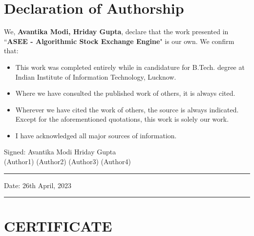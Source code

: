 \thispagestyle{empty}

\setcounter{page}{3}

\chapter*{Declaration of Authorship}

\vspace{1cm}

\noindent 
We, \textbf{Avantika Modi, Hriday Gupta}, declare that the work presented in ``\textbf{ASEE - Algorithmic Stock Exchange Engine}" is our own. We confirm that:

\medskip

\begin{itemize} 
    \item This work was completed entirely while in candidature for B.Tech. degree at Indian Institute of Information Technology, Lucknow.
    
    \medskip
    
    \item Where we have consulted the published work of others, it is always cited.
    
    \medskip
    
    \item Wherever we have cited the work of others, the source is always indicated. Except for the aforementioned quotations, this work is solely our work.
    
    \medskip
    
    \item I have acknowledged all major sources of information.
\end{itemize}

\vspace{2cm}

\noindent Signed: \hspace{0.4cm}Avantika Modi \hspace{0.4cm} Hriday Gupta\\

\hspace{1.5cm}(Author1) \hfill (Author2) \hfill (Author3) \hfill (Author4)
\rule[0.5em]{33em}{0.5pt} 
 
\noindent Date: 26th April, 2023\\
\rule[0.5em]{33em}{0.5pt}

\cleardoublepage

\chapter*{CERTIFICATE}

